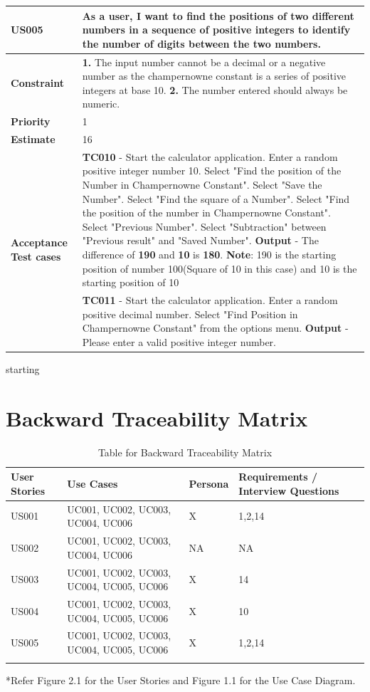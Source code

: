 \documentclass[12pt, a4paper]{report}
\begin{document}
\begin{tabular}{|p{3cm}|p{12cm}|}
\hline
     \textbf{US005} &  As a user, I want to find the positions of two different numbers in a sequence of positive integers to identify the number of digits between the two numbers.\\\hline
     \textbf{Constraint} &  \textbf{1. } The input number cannot be a decimal or a negative number as the champernowne constant is a series of positive integers at base 10. \newline \textbf{2. } The number entered should always be numeric.\\\hline
     \textbf{Priority} & 1 \\\hline
     \textbf{Estimate} & 16 \\\hline
     \multirow{2}{3cm}{\textbf{Acceptance Test cases}} & \textbf{TC010} - Start the calculator application. Enter a random positive integer number 10. Select "Find the position of the Number in Champernowne Constant". Select "Save the Number". Select "Find the square of a Number". Select "Find the position of the number in Champernowne Constant". Select "Previous Number". Select "Subtraction" between "Previous result" and  "Saved Number". \newline \textbf{Output} - The difference of \textbf{190} and \textbf{10} is \textbf{180}. \newline \textbf{Note}: 190 is the starting position of number 100(Square of 10 in this case) and 10 is the starting position of 10  \\\cline{2-2}
     & \textbf{TC011} - Start the calculator application. Enter a random positive decimal number. Select "Find Position in Champernowne Constant" from the options menu. \newline \textbf{Output} - Please enter a valid positive integer number.\\\hline
\end{tabular}starting 

\chapter {Backward Traceability Matrix}

\begin{longtable}{|p{1.5cm}|p{3cm}|p{2cm}|p{4cm}|}

    \hline
    User Stories & Use Cases & Persona & Requirements / Interview Questions \\\hline
    US001 & UC001, UC002, UC003, UC004, UC006 & X & 1,2,14\\\hline
    US002 & UC001, UC002, UC003, UC004, UC006 &NA &NA\\\hline
    US003 & UC001, UC002, UC003, UC004, UC005, UC006 & X & 14\\\hline
    US004 & UC001, UC002, UC003, UC004, UC005, UC006 & X & 10\\\hline
    US005 & UC001, UC002, UC003, UC004, UC005, UC006 & X & 1,2,14\\\hline
\caption{Table for Backward Traceability Matrix}
\label{table:1}
\end{longtable}
{*Refer Figure 2.1 for the User Stories and Figure 1.1 for the Use Case Diagram.}
\\
\end{document}
